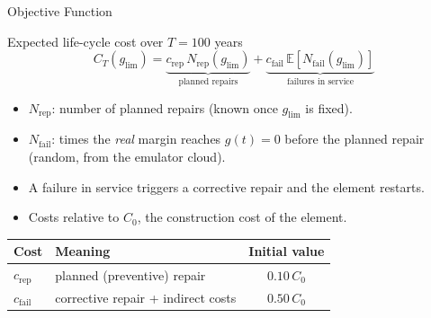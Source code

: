 \begin{frame}{Objective Function}

\justifying

\begin{exampleblock}{Expected life-cycle cost over $T = 100$ years}
\[
  C_T(g_\mathrm{lim}) = \underbrace{c_\mathrm{rep}\, N_\mathrm{rep}(g_\mathrm{lim})}_{\text{planned repairs}}
  + \underbrace{c_\mathrm{fail}\, \mathbb{E}\left[N_\mathrm{fail}(g_\mathrm{lim})\right]}_{\text{failures in service}}
\]
\end{exampleblock}

\vspace{0.2cm}

\begin{itemize}
  \item $N_\mathrm{rep}$: number of planned repairs (known once $g_\mathrm{lim}$ is fixed).
  \item $N_\mathrm{fail}$: times the \emph{real} margin reaches $g(t) = 0$ before the planned repair (random, from the emulator cloud).
  \item A failure in service triggers a corrective repair and the element restarts.
  \item Costs relative to $C_0$, the construction cost of the element.
\end{itemize}

\vspace{0.1cm}

\centering
\begin{tabular}{@{}llc@{}}
\toprule
\textbf{Cost} & \textbf{Meaning} & \textbf{Initial value} \\ \midrule
$c_\mathrm{rep}$ & planned (preventive) repair & $0.10\, C_0$ \\
$c_\mathrm{fail}$ & corrective repair + indirect costs & $0.50\, C_0$ \\ \bottomrule
\end{tabular}

\end{frame}
